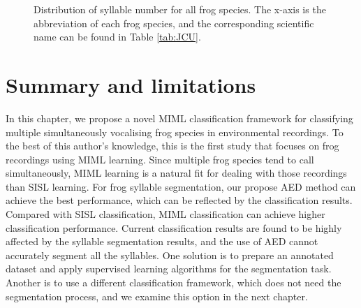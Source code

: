 \begin{figure}[htb!] %
\caption[Distribution of syllable number for all frog species]{Distribution of syllable number for all frog species. The x-axis is the abbreviation of each frog species, and the corresponding scientific name can be found in Table \ref{tab:JCU}.}
\label{fig:Ch6_syllable} 
\end{figure}

\section{Summary and limitations}
In this chapter, we propose a novel MIML classification framework for classifying multiple simultaneously vocalising frog species in environmental recordings. To the best of this author's knowledge, this is the first study that focuses on frog recordings using MIML learning. Since multiple frog species tend to call simultaneously, MIML learning is a natural fit for dealing with those recordings than SISL learning. For frog syllable segmentation, our propose AED method can achieve the best performance, which can be reflected by the classification results. Compared with SISL classification, MIML classification can achieve higher classification performance. Current classification results are found to be highly affected by the syllable segmentation results, and the use of AED cannot accurately segment all the syllables. One solution is to prepare an annotated dataset and apply supervised learning algorithms for the segmentation task. Another is to use a different classification framework, which does not need the segmentation process, and we examine this option in the next chapter.


